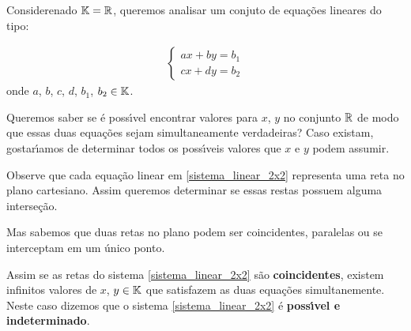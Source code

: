 Considerenado $\mathbb{K} = \mathbb{R}$, queremos analisar um conjuto de equa\c{c}\~oes lineares do tipo:

\begin{align}
    \begin{cases}\label{sistema_linear_2x2}
        ax + by = b_1\\
        cx + dy = b_2
    \end{cases}
\end{align}
onde $a$, $b$, $c$, $d$, $b_1$, $b_2 \in \mathbb{K}$.

Queremos saber se \'e poss{\'\i}vel encontrar valores para $x$, $y$ no conjunto $\mathbb{R}$ de modo que essas duas equa\c{c}\~oes sejam simultaneamente verdadeiras? Caso existam, gostar{\'\i}amos de determinar todos os poss{\'\i}veis valores que $x$ e $y$ podem assumir.

Observe que cada equa\c{c}\~ao linear em \eqref{sistema_linear_2x2} representa uma reta no plano cartesiano. Assim queremos determinar se essas restas possuem alguma interse\c{c}\~ao.

Mas sabemos que duas retas no plano podem ser coincidentes, paralelas ou se interceptam em um \'unico ponto.

Assim se as retas do sistema \eqref{sistema_linear_2x2} s\~ao \textbf{coincidentes}, existem infinitos valores de $x$, $y \in \mathbb{K}$ que satisfazem as duas equa\c{c}\~oes simultanemente. Neste caso dizemos que o sistema \eqref{sistema_linear_2x2} \'e \textbf{poss{\'\i}vel e indeterminado}.

\begin{center}
\end{center}

